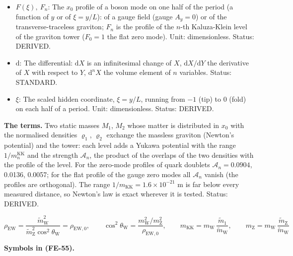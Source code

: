 \documentclass[
  10pt,
]{article}
\begin{document}
\begin{itemize}
  \(V_{\mathrm{N}}\) as probability densities in \(\xi\)
  (\(\int_{-1}^{0}\varrho_1\,\mathrm{d}\xi = 1\)): \(L\) times the
  profile \(\varrho_f\) of the zero mode of each source. Unit:
  dimensionless. Status: DERIVED.
\item
  \(F(\xi),\ F_n\): The \(x_0\) profile of a boson mode on one half of
  the period (a function of \(y\) or of \(\xi = y/L\)): of a gauge field
  (gauge \(A_y = 0\)) or of the transverse-traceless graviton; \(F_n\)
  is the profile of the \(n\)-th Kaluza-Klein level of the graviton
  tower (\(F_0 = 1\) the flat zero mode). Unit: dimensionless. Status:
  DERIVED.
\item
  \(\mathrm{d}\): The differential: \(\mathrm{d}X\) is an infinitesimal
  change of \(X\), \(\mathrm{d}X/\mathrm{d}Y\) the derivative of \(X\)
  with respect to \(Y\), \(\mathrm{d}^nX\) the volume element of \(n\)
  variables. Status: STANDARD.
\item
  \(\xi\): The scaled hidden coordinate, \(\xi = y/L\), running from
  \(-1\) (tip) to \(0\) (fold) on each half of a period. Unit:
  dimensionless. Status: DERIVED.
\end{itemize}

\textbf{The terms.} Two static masses \(M_1\), \(M_2\) whose matter is
distributed in \(x_0\) with the normalised densities \(\varrho_1\),
\(\varrho_2\) exchange the massless graviton (Newton's potential) and
the tower: each level adds a Yukawa potential with the range
\(1/m^{\mathrm{KK}}_n\) and the strength \(\mathcal{A}_n\), the product
of the overlaps of the two densities with the profile of the level. For
the zero-mode profiles of quark doublets \(\mathcal{A}_n = 0.0904\),
0.0136, 0.0057; for the flat profile of the gauge zero modes all
\(\mathcal{A}_n\) vanish (the profiles are orthogonal). The range
\(1/m_{\mathrm{KK}} = 1.6\times10^{-21}\) m is far below every measured
distance, so Newton's law is exact wherever it is tested. Status:
DERIVED.

\[
\rho_{\mathrm{EW}} = \frac{\tilde m_{\mathrm{W}}^2}{\tilde m_{\mathrm{Z}}^2\cos^2\theta_{\mathrm{W}}} =
 \rho_{\mathrm{EW},0},\qquad
\cos^2\theta_{\mathrm{W}} = \frac{m_{\mathrm{W}}^2/m_{\mathrm{Z}}^2}{\rho_{\mathrm{EW},0}},\qquad
m_{\mathrm{KK}} = m_{\mathrm{W}}\,\frac{\tilde m_1}{\tilde m_{\mathrm{W}}},\qquad
m_{\mathrm{Z}} = m_{\mathrm{W}}\,\frac{\tilde m_{\mathrm{Z}}}{\tilde m_{\mathrm{W}}} \tag{FE-55}
\]

\textbf{Symbols in (FE-55).}
\end{document}
